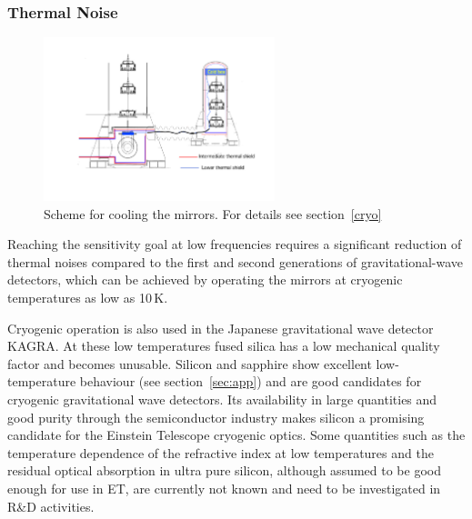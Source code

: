 \subsubsection{Thermal Noise}
\begin{figure}
\vskip -0.6cm
	\centering
		\includegraphics[width=0.6\textwidth]{./Intro/Intro_Figures/ET_main-cryostat.pdf}
	\caption{Scheme for cooling the mirrors. For details see section~\ref{cryo}}
\vskip -0.1cm
\end{figure} 

Reaching the sensitivity goal at low frequencies requires a significant reduction 
of thermal noises compared to the first and second generations of gravitational-wave 
detectors, which can be achieved by operating the mirrors at cryogenic temperatures 
as low as 10\,K.  

Cryogenic operation is also used in the Japanese gravitational wave detector KAGRA. At these low temperatures fused silica has a low mechanical quality factor and becomes unusable. Silicon and sapphire show 
excellent low-temperature behaviour (see section~\ref{sec:app}) and are good 
candidates for cryogenic gravitational wave detectors. Its availability in large 
quantities and good purity through the semiconductor industry makes silicon a 
promising candidate for the Einstein Telescope cryogenic optics. Some quantities 
such as the temperature dependence of the refractive index at low temperatures 
and the residual optical absorption in ultra pure silicon, although assumed to be 
good enough for use in ET, are currently not known and need to be 
investigated in R\&D activities.

